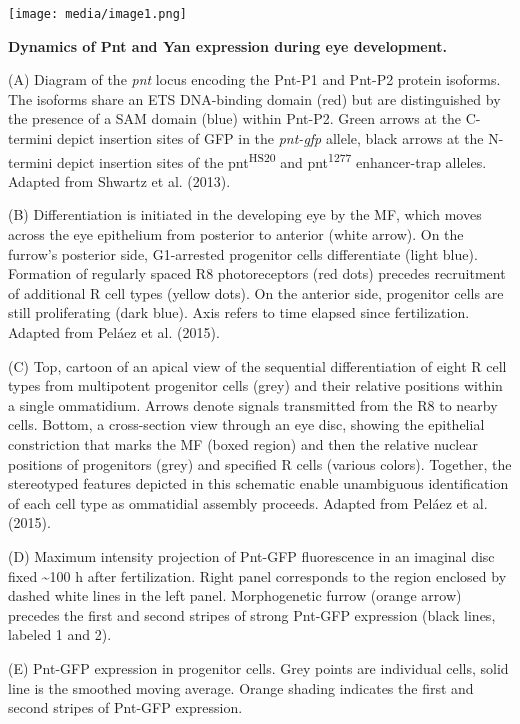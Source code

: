\texttt{[image: media/image1.png]}

\textbf{Dynamics of Pnt and Yan expression during eye development.}

(A) Diagram of the \emph{pnt} locus encoding the Pnt-P1 and Pnt-P2 protein isoforms. The isoforms share an ETS DNA-binding domain (red) but are distinguished by the presence of a SAM domain (blue) within Pnt-P2. Green arrows at the C-termini depict insertion sites of GFP in the \emph{pnt-gfp} allele, black arrows at the N-termini depict insertion sites of the pnt\textsuperscript{HS20} and pnt\textsuperscript{1277} enhancer-trap alleles. Adapted from Shwartz et al. (2013).

(B) Differentiation is initiated in the developing eye by the MF, which moves across the eye epithelium from posterior to anterior (white arrow). On the furrow's posterior side, G1-arrested progenitor cells differentiate (light blue). Formation of regularly spaced R8 photoreceptors (red dots) precedes recruitment of additional R cell types (yellow dots). On the anterior side, progenitor cells are still proliferating (dark blue). Axis refers to time elapsed since fertilization. Adapted from Peláez et al. (2015).

(C) Top, cartoon of an apical view of the sequential differentiation of eight R cell types from multipotent progenitor cells (grey) and their relative positions within a single ommatidium. Arrows denote signals transmitted from the R8 to nearby cells. Bottom, a cross-section view through an eye disc, showing the epithelial constriction that marks the MF (boxed region) and then the relative nuclear positions of progenitors (grey) and specified R cells (various colors). Together, the stereotyped features depicted in this schematic enable unambiguous identification of each cell type as ommatidial assembly proceeds. Adapted from Peláez et al. (2015).

(D) Maximum intensity projection of Pnt-GFP fluorescence in an imaginal disc fixed \textasciitilde{}100 h after fertilization. Right panel corresponds to the region enclosed by dashed white lines in the left panel. Morphogenetic furrow (orange arrow) precedes the first and second stripes of strong Pnt-GFP expression (black lines, labeled 1 and 2).

(E) Pnt-GFP expression in progenitor cells. Grey points are individual cells, solid line is the smoothed moving average. Orange shading indicates the first and second stripes of Pnt-GFP expression.

